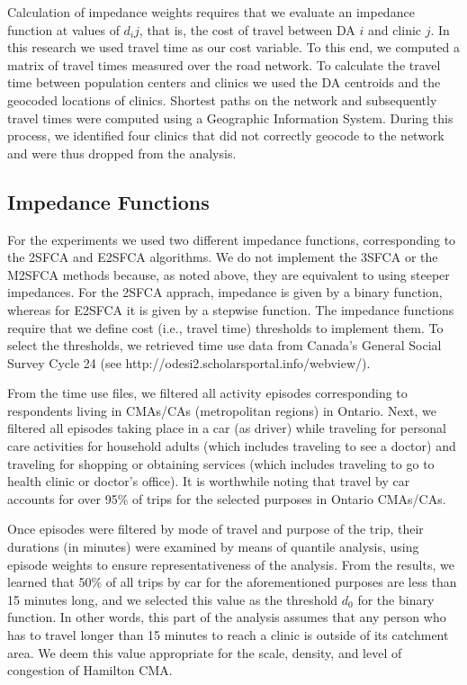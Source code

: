 \documentclass[10pt,letterpaper]{article}
\begin{document}
Calculation of impedance weights requires that we evaluate an impedance
function at values of \(d_ij\), that is, the cost of travel between DA
\(i\) and clinic \(j\). In this research we used travel time as our cost
variable. To this end, we computed a matrix of travel times measured
over the road network. To calculate the travel time between population
centers and clinics we used the DA centroids and the geocoded locations
of clinics. Shortest paths on the network and subsequently travel times
were computed using a Geographic Information System. During this
process, we identified four clinics that did not correctly geocode to
the network and were thus dropped from the analysis.

\subsection{Impedance Functions}\label{impedance-functions}

For the experiments we used two different impedance functions,
corresponding to the 2SFCA and E2SFCA algorithms. We do not implement
the 3SFCA or the M2SFCA methods because, as noted above, they are
equivalent to using steeper impedances. For the 2SFCA apprach, impedance
is given by a binary function, whereas for E2SFCA it is given by a
stepwise function. The impedance functions require that we define cost
(i.e., travel time) thresholds to implement them. To select the
thresholds, we retrieved time use data from Canada's General Social
Survey Cycle 24 (see http://odesi2.scholarsportal.info/webview/).

From the time use files, we filtered all activity episodes corresponding
to respondents living in CMAs/CAs (metropolitan regions) in Ontario.
Next, we filtered all episodes taking place in a car (as driver) while
traveling for personal care activities for household adults (which
includes traveling to see a doctor) and traveling for shopping or
obtaining services (which includes traveling to go to health clinic or
doctor's office). It is worthwhile noting that travel by car accounts
for over 95\% of trips for the selected purposes in Ontario CMAs/CAs.

Once episodes were filtered by mode of travel and purpose of the trip,
their durations (in minutes) were examined by means of quantile
analysis, using episode weights to ensure representativeness of the
analysis. From the results, we learned that 50\% of all trips by car for
the aforementioned purposes are less than 15 minutes long, and we
selected this value as the threshold \(d_0\) for the binary function. In
other words, this part of the analysis assumes that any person who has
to travel longer than 15 minutes to reach a clinic is outside of its
catchment area. We deem this value appropriate for the scale, density,
and level of congestion of Hamilton CMA.
\end{document}
